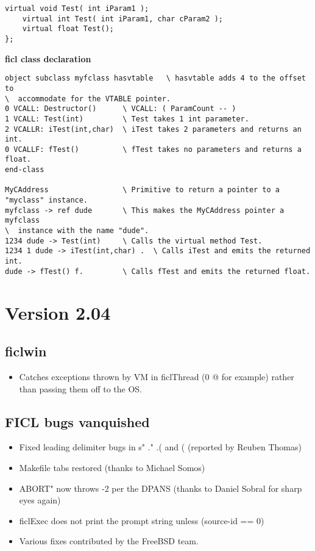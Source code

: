 \begin{itemize}[noitemsep]
\begin{lstlisting}[frame=single]
	virtual void Test( int iParam1 );
	virtual int Test( int iParam1, char cParam2 );
	virtual float Test();
};
\end{lstlisting}
	\textbf{ficl class declaration}
\begin{lstlisting}[frame=single]
object subclass myfclass hasvtable   \ hasvtable adds 4 to the offset to
\  accommodate for the VTABLE pointer.
0 VCALL: Destructor()      \ VCALL: ( ParamCount -- )
1 VCALL: Test(int)         \ Test takes 1 int parameter.
2 VCALLR: iTest(int,char)  \ iTest takes 2 parameters and returns an int.  
0 VCALLF: fTest()          \ fTest takes no parameters and returns a float.
end-class

MyCAddress                 \ Primitive to return a pointer to a "myclass" instance.
myfclass -> ref dude       \ This makes the MyCAddress pointer a myfclass
\  instance with the name "dude".
1234 dude -> Test(int)     \ Calls the virtual method Test.
1234 1 dude -> iTest(int,char) .  \ Calls iTest and emits the returned int.
dude -> fTest() f.         \ Calls fTest and emits the returned float.
\end{lstlisting}
\end{itemize}


\section*{Version 2.04}
\subsection*{ficlwin}
\begin{itemize}[noitemsep]
	\item Catches exceptions thrown by VM in ficlThread (0 @ for
	example) rather than passing them off to the OS.
\end{itemize}


\subsection*{FICL bugs vanquished}
\begin{itemize}[noitemsep]
	\item Fixed leading delimiter bugs in s" ." .( and (
	(reported by Reuben Thomas)

	\item Makefile tabs restored (thanks to Michael Somos)

	\item ABORT" now throws -2 per the DPANS (thanks to Daniel
	Sobral for sharp eyes again)

	\item ficlExec does not print the prompt string unless
	(source-id == 0)

	\item Various fixes contributed by the FreeBSD team.
\end{itemize}


